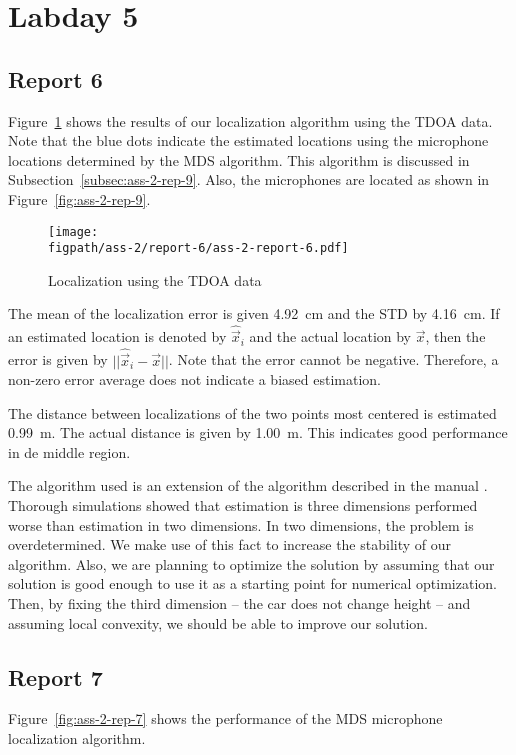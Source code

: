 \documentclass[11pt,titlepage]{report}
\newcommand{\figpath}{../../deliverable-7-resources/figures}
\begin{document}
\section{Labday 5}
\subsection{Report 6}
Figure~\ref{fig:ass-2-rep-6} shows the results of our localization algorithm using the TDOA data. Note that the blue dots indicate the estimated locations using the microphone locations determined by the MDS algorithm. This algorithm is discussed in Subsection~\ref{subsec:ass-2-rep-9}. Also, the microphones are located as shown in Figure~\ref{fig:ass-2-rep-9}.

\begin{figure}[H]
	\begin{center}
		\texttt{[image: \\figpath/ass-2/report-6/ass-2-report-6.pdf]}
	\end{center}
	\caption{Localization using the TDOA data}
	\label{fig:ass-2-rep-6}
\end{figure}

The mean of the localization error is given \SI{4.92}{cm} and the STD by \SI{4.16}{cm}. If an estimated location is denoted by $\hat{\vec{x}}_i$ and the actual location by $\vec{x}$, then the error is given by $||\hat{\vec{x}}_i - \vec{x}||$. Note that the error cannot be negative. Therefore, a non-zero error average does not indicate a biased estimation.

The distance between localizations of the two points most centered is estimated \SI{0.99}{m}. The actual distance is given by \SI{1.00}{m}. This indicates good performance in de middle region.

The algorithm used is an extension of the algorithm described in the manual \cite{epo4-manual}. Thorough simulations showed that estimation is three dimensions performed worse than estimation in two dimensions. In two dimensions, the problem is overdetermined. We make use of this fact to increase the stability of our algorithm. Also, we are planning to optimize the solution by assuming that our solution is good enough to use it as a starting point for numerical optimization. Then, by fixing the third dimension -- the car does not change height -- and assuming local convexity, we should be able to improve our solution.

\subsection{Report 7}
Figure~\ref{fig:ass-2-rep-7} shows the performance of the MDS microphone localization algorithm.
\end{document}
